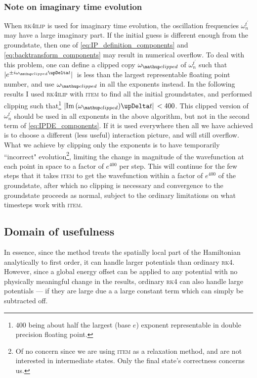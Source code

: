 \subsubsection{Note on imaginary time evolution}

When \textsc{rk4ilip} is used for imaginary time evolution, the oscillation frequencies $\omega_n^{t^\prime}$ may have a large imaginary part. If the initial guess is different enough from the groundstate, then one of \eqref{eq:IP_definition_components} and \eqref{eq:backtransform_components} may result in numerical overflow. To deal with this problem, one can define a clipped copy $\omega_\up{clipped}$ of $\omega_n^{t^\prime}$ such that $\abs*{e^{\pm i\omega_\up{clipped}\upDelta t}}$ is less than the largest representable floating point number, and use $\omega_\up{clipped}$ in all the exponents instead. In the following results I used \textsc{rk4ilip} with \textsc{item} to find all the initial groundstates, and performed clipping such that\footnote{$400$ being about half the largest (base $e$) exponent representable in double precision floating point.} {$\abs*{\im{(\omega_\up{clipped})}\upDelta t} < 400$}. This clipped version of $\omega_n^{t^\prime}$ should be used in all exponents in the above algorithm, but not in the second term of \eqref{eq:IPDE_components}. If it is used everywhere then all we have achieved is to choose a different (less useful) interaction picture, and will still overflow. What we achieve by clipping only the exponents is to have temporarily ``incorrect" evolution\footnote{Of no concern since we are using \textsc{item} as a relaxation method, and are not interested in intermediate states. Only the final state's correctness concerns us.}, limiting the change in magnitude of the wavefunction at each point in space to a factor of $e^{400}$ per step. This will continue for the few steps that it takes \textsc{item} to get the wavefunction within a factor of $e^{400}$ of the groundstate, after which no clipping is necessary and convergence to the groundstate proceeds as normal, subject to the ordinary limitations on what timesteps work with \textsc{item}.

\subsection{Domain of usefulness}

 In essence, since the method treats the spatially local part of the Hamiltonian analytically to first order, it can handle larger potentials than ordinary \textsc{rk4}. However, since a global energy offset can be applied to any potential with no physically meaningful change in the results, ordinary \textsc{rk4} can also handle large potentials --- if they are large due a a large constant term which can simply be subtracted off.

